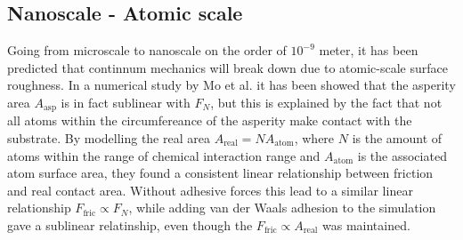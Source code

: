 










\subsection{Nanoscale - Atomic scale}


Going from microscale to nanoscale on the order
of $10^{-9}$ meter, it has been predicted that continnum mechanics will break
down \cite{luan_breakdown_2005} due to atomic-scale surface roughness. In a
numerical study by Mo et al. \cite{mo_friction_2009} it has been showed that the
asperity area $A_{\text{asp}}$ is in fact sublinear with $F_N$, but this is explained by the fact that not all atoms within the circumfereance of the asperity make contact with the substrate. By modelling the real area $A_{\text{real}} = N
A_{\text{atom}}$, where $N$ is the amount of atoms within the range of chemical
interaction range and $A_{\text{atom}}$ is the associated atom surface area, they found a consistent linear relationship between friction and real contact area. Without
adhesive forces this lead to a similar linear relationship $F_{\text{fric}}
\propto F_N$, while adding van der Waals adhesion to the simulation gave a
sublinear relatinship, even though the $F_{\text{fric}} \propto A_{\text{real}}$
was maintained.

